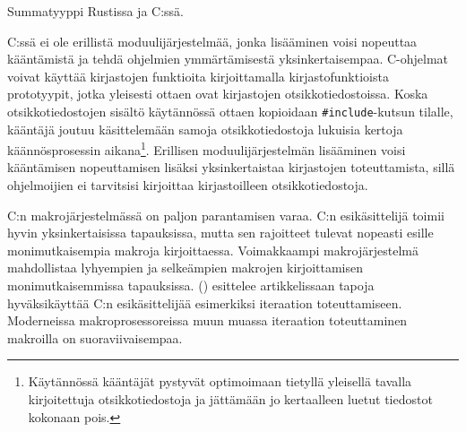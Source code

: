 \begin{listing}[ht!]
    \inputminted{Rust}{koodi/rustenum.rs}
    \inputminted[firstline=3]{C}{koodi/csumtype.c}
    \caption{Summatyyppi Rustissa ja C:ssä.}
    \label{fig:csumtype}
\end{listing}


C:ssä ei ole erillistä moduulijärjestelmää, jonka lisääminen voisi nopeuttaa
kääntämistä ja tehdä ohjelmien ymmärtämisestä yksinkertaisempaa. C-ohjelmat
voivat käyttää kirjastojen funktioita kirjoittamalla kirjastofunktioista
prototyypit, jotka yleisesti ottaen ovat kirjastojen otsikkotiedostoissa. Koska
otsikkotiedostojen sisältö käytännössä ottaen kopioidaan
\texttt{\#include}-kutsun tilalle, kääntäjä joutuu käsittelemään samoja
otsikkotiedostoja lukuisia kertoja käännösprosessin aikana\footnote{Käytännössä
kääntäjät pystyvät optimoimaan tietyllä yleisellä tavalla kirjoitettuja
otsikkotiedostoja ja jättämään jo kertaalleen luetut tiedostot kokonaan pois.}.
Erillisen moduulijärjestelmän lisääminen voisi kääntämisen nopeuttamisen
lisäksi yksinkertaistaa kirjastojen toteuttamista, sillä ohjelmoijien ei
tarvitsisi kirjoittaa kirjastoilleen otsikkotiedostoja. 

C:n makrojärjestelmässä on paljon parantamisen varaa. C:n esikäsittelijä toimii
hyvin yksinkertaisissa tapauksissa, mutta sen rajoitteet tulevat nopeasti
esille monimutkaisempia makroja kirjoittaessa. Voimakkaampi makrojärjestelmä
mahdollistaa lyhyempien ja selkeämpien makrojen kirjoittamisen
monimutkaisemmissa tapauksissa. \citeauthor{cabuse} (\citeyear{cabuse})
esittelee artikkelissaan tapoja hyväksikäyttää C:n esikäsittelijää esimerkiksi
iteraation toteuttamiseen. Moderneissa makroprosessoreissa muun muassa
iteraation toteuttaminen makroilla on suoraviivaisempaa.



